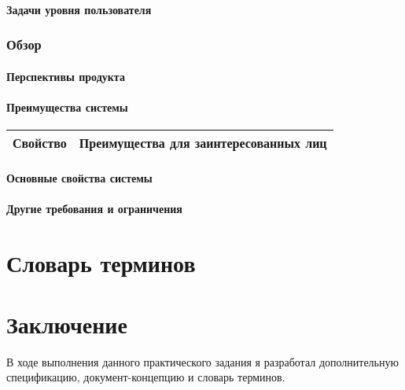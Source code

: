 \documentclass[a4paper, 14pt]{extarticle}
\begin{document}
\paragraph*{Задачи уровня пользователя}


\subsubsection*{Обзор}

\paragraph*{Перспективы продукта}


\paragraph*{Преимущества системы}


\begin{longtable}{|L{0.47\textwidth}|L{0.47\textwidth}|}
  \hline
  \textbf{Свойство} & \textbf{Преимущества для заинтересованных лиц} \\
  \hline
\end{longtable}

\paragraph*{Основные свойства системы}


\paragraph*{Другие требования и ограничения}


\section{Словарь терминов}


\section{Заключение}

В ходе выполнения данного практического задания я разработал дополнительную
спецификацию, документ-концепцию и словарь терминов.
\end{document}
